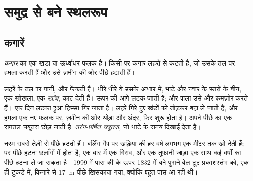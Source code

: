 \section{समुद्र से बने स्थलरूप}

\subsection{कगारें}

\begin{definition}[कगार]\label{def:g9:landforms:cliff}
\emph{कगार}  का एक खड़ा या ऊर्ध्वाधर फलक है। किसी  पर कगार
लहरों से कटती है, जो उसके तल पर हमला करती हैं और उसे ज़मीन की ओर पीछे
हटाती हैं।
\end{definition}

लहरें  के तल पर पानी,  और  फेंकती हैं। धीरे-धीरे वे उसके आधार में, भाटे और ज्वार
के स्तरों के बीच, एक खोखला, एक \emph{खाँच}, काट देती हैं। ऊपर की  आगे लटक जाती
है;  और पाला उसे और कमज़ोर करते हैं। एक दिन लटका हुआ हिस्सा गिर जाता है। लहरें गिरे
हुए खंडों को तोड़कर बहा ले जाती हैं, और हमला एक नए फलक पर, ज़मीन की ओर थोड़ा और अंदर,
फिर शुरू होता है। अपने पीछे   का एक समतल चबूतरा छोड़ जाती है, \emph{तरंग-घर्षित
चबूतरा}, जो भाटे के समय दिखाई देता
है।

नरम  सबसे तेज़ी से पीछे हटती हैं। बर्लिंग गैप पर खड़िया की  हर वर्ष लगभग एक
मीटर तक खो देती हैं; पर पीछे हटना छलाँगों में होता है, एक बार में एक गिराव, और एक तूफ़ानी
जाड़ा एक साथ कई वर्षों का पीछे हटना ले जा सकता है। 1999 में पास की  के ऊपर 1832 में
बने पुराने बेल टूट प्रकाशस्तंभ को, एक ही टुकड़े में, किनारे से \qty{17}{m} पीछे खिसकाया
गया, क्योंकि  बहुत पास आ रही
थी।

